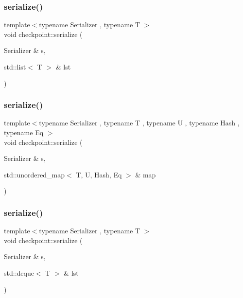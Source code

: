 \mbox{\label{namespacecheckpoint_afb32627049eb840e4f8b9fd3022f2eb2}} 
\subsubsection{\texorpdfstring{serialize()}{serialize()}\hspace{0.1cm}{\footnotesize\ttfamily [22/30]}}
{\footnotesize\ttfamily template$<$typename Serializer , typename T $>$ \\
void checkpoint\+::serialize (\begin{DoxyParamCaption}\item[{Serializer \&}]{s,  }\item[{std\+::list$<$ T $>$ \&}]{lst }\end{DoxyParamCaption})\hspace{0.3cm}{\ttfamily [inline]}}

\mbox{\label{namespacecheckpoint_a9fc2f3eb20d3ce8d6145e99a2559ea58}} 
\subsubsection{\texorpdfstring{serialize()}{serialize()}\hspace{0.1cm}{\footnotesize\ttfamily [23/30]}}
{\footnotesize\ttfamily template$<$typename Serializer , typename T , typename U , typename Hash , typename Eq $>$ \\
void checkpoint\+::serialize (\begin{DoxyParamCaption}\item[{Serializer \&}]{s,  }\item[{std\+::unordered\+\_\+map$<$ T, U, Hash, Eq $>$ \&}]{map }\end{DoxyParamCaption})\hspace{0.3cm}{\ttfamily [inline]}}

\mbox{\label{namespacecheckpoint_a179b767294c9b23617f30fc4566d0be7}} 
\subsubsection{\texorpdfstring{serialize()}{serialize()}\hspace{0.1cm}{\footnotesize\ttfamily [24/30]}}
{\footnotesize\ttfamily template$<$typename Serializer , typename T $>$ \\
void checkpoint\+::serialize (\begin{DoxyParamCaption}\item[{Serializer \&}]{s,  }\item[{std\+::deque$<$ T $>$ \&}]{lst }\end{DoxyParamCaption})\hspace{0.3cm}{\ttfamily [inline]}}

